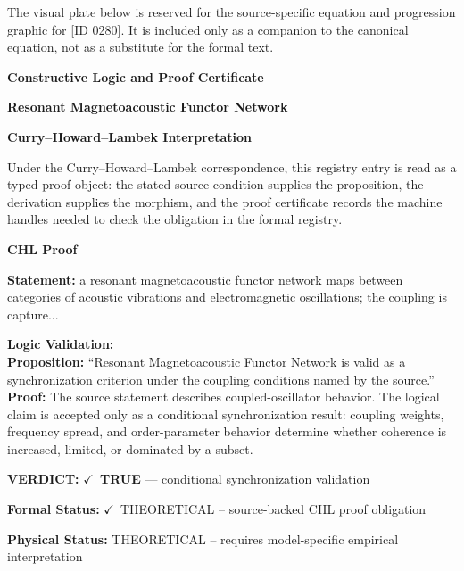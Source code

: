 \begingroup\footnotesize\sloppy
The visual plate below is reserved for the source-specific equation and progression graphic for [ID 0280]. It is included only as a companion to the canonical equation, not as a substitute for the formal text.
\par\endgroup
\ifTZPDarkEdition
{}
\fi

\clearpage
\begingroup\tzpsupportsetup
\noindent\textbf{\fontsize{10.8pt}{12.8pt}\selectfont [ID 0280] Constructive Logic and Proof Certificate}\par
\noindent\textbf{\fontsize{10pt}{12pt}\selectfont Resonant Magnetoacoustic Functor Network}\par
\vspace{0.45em}
\begingroup
\footnotesize
\setlength{\parskip}{0.22em}
\setlength{\parindent}{0pt}
\noindent\textbf{Curry--Howard--Lambek Interpretation}\par
Under the Curry--Howard--Lambek correspondence, this registry entry is read as a typed proof
object: the stated source condition supplies the proposition, the derivation supplies the
morphism, and the proof certificate records the machine handles needed to check the obligation
in the formal registry.

\vspace{0.45em}
\noindent\textbf{CHL Proof}\par
\textbf{Statement:} a resonant magnetoacoustic functor network maps between categories of acoustic
vibrations and electromagnetic oscillations; the coupling is capture...

\textbf{Logic Validation:}\\
\textbf{Proposition:} ``Resonant Magnetoacoustic Functor Network is valid as a synchronization criterion under
the coupling conditions named by the source.''\\
\textbf{Proof:} The source statement describes coupled-oscillator behavior. The logical claim is
accepted only as a conditional synchronization result: coupling weights, frequency
spread, and order-parameter behavior determine whether coherence is increased, limited,
or dominated by a subset.

\textbf{VERDICT:} \ensuremath{\checkmark}\ \textbf{TRUE} --- conditional synchronization validation

\textbf{Formal Status:} \ensuremath{\checkmark}\ THEORETICAL -- source-backed CHL proof obligation

\textbf{Physical Status:} THEORETICAL -- requires model-specific empirical interpretation
\par\vspace{0.45em}
\par
\ifTZPDarkEdition
{}
\fi
\endgroup
\endgroup
